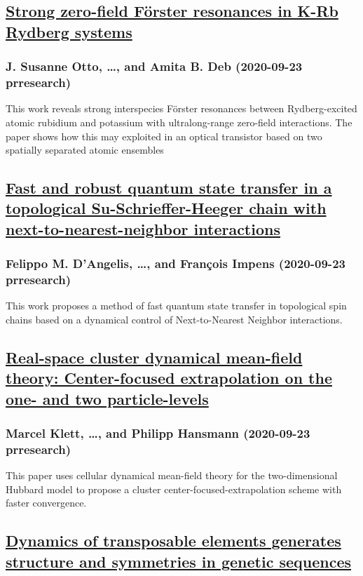 \subsection*{\href{http://link.aps.org/doi/10.1103/PhysRevResearch.2.033474}{Strong zero-field Förster resonances in K-Rb Rydberg systems}}
\subsubsection*{J. Susanne Otto, \dots, and Amita B. Deb (2020-09-23 prresearch)}
This work reveals strong interspecies Förster resonances between Rydberg-excited atomic rubidium and potassium with ultralong-range zero-field interactions. The paper shows how this may exploited in an optical transistor based on two spatially separated atomic ensembles
\subsection*{\href{http://link.aps.org/doi/10.1103/PhysRevResearch.2.033475}{Fast and robust quantum state transfer in a topological Su-Schrieffer-Heeger chain with next-to-nearest-neighbor interactions}}
\subsubsection*{Felippo M. D'Angelis, \dots, and François Impens (2020-09-23 prresearch)}
This work proposes a method of fast quantum state transfer in topological spin chains based on a dynamical control of Next-to-Nearest Neighbor interactions.
\subsection*{\href{http://link.aps.org/doi/10.1103/PhysRevResearch.2.033476}{Real-space cluster dynamical mean-field theory: Center-focused extrapolation on the one- and two particle-levels}}
\subsubsection*{Marcel Klett, \dots, and Philipp Hansmann (2020-09-23 prresearch)}
This paper uses cellular dynamical mean-field theory for the two-dimensional Hubbard model to propose a cluster center-focused-extrapolation scheme with faster convergence.
\subsection*{\href{http://link.aps.org/doi/10.1103/PhysRevResearch.2.033477}{Dynamics of transposable elements generates structure and symmetries in genetic sequences}}
